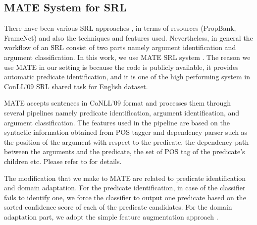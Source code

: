 \subsection{MATE System for SRL}

There have been various  SRL approaches , in terms of resources  (PropBank, FrameNet) and also the techniques and features used. Nevertheless, in general the workflow of an SRL consist of two parts namely argument identification and argument classification.  In this work, we use MATE  SRL system \cite{bjorkelund2009multilingual}. The reason we use MATE in our setting is because the code is publicly available, it provides automatic predicate identification, and it is one of the high performing system in  ConLL'09 SRL shared task for English dataset. 

MATE accepts sentences in CoNLL'09 format and processes them through several pipelines namely predicate identification, argument identification, and argument classification. The features used in the pipeline are based on the syntactic information obtained from POS tagger and dependency parser such as the position of the argument with respect to the predicate, the dependency path between the arguments and the predicate, the set of POS tag of the predicate's children etc. Please refer to \cite{bjorkelund2009multilingual} for details.  

The modification that we make to MATE are related to predicate identification and domain adaptation. For the predicate identification, in case of the classifier fails to identify one, we force the classifier to output one predicate based on the sorted confidence score of each of the predicate candidates. For the domain adaptation part, we adopt the simple feature augmentation approach \cite{daume2009frustratingly}.

